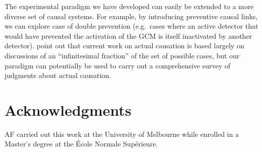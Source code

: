 \documentclass[10pt,letterpaper]{article}
\begin{document}


The experimental paradigm we have developed can easily be extended to a more diverse set of causal systems. For example, by introducing preventive causal links, we can explore case of double prevention (e.g.\ cases where an active detector that would have prevented the activation of the GCM is itself inactivated by another detector).  point out that current work on actual causation is based largely on discussions of an ``infinitesimal fraction'' of the set of possible cases, but our paradigm can potentially be used to carry out a comprehensive survey of judgments about actual causation.


\section{Acknowledgments}

AF carried out this work at the University of Melbourne while enrolled in a Master's degree at the \'{E}cole Normale Sup\'{e}rieure. 


\setlength{\bibleftmargin}{.125in}
\setlength{\bibindent}{-\bibleftmargin}

\balance

\end{document}
